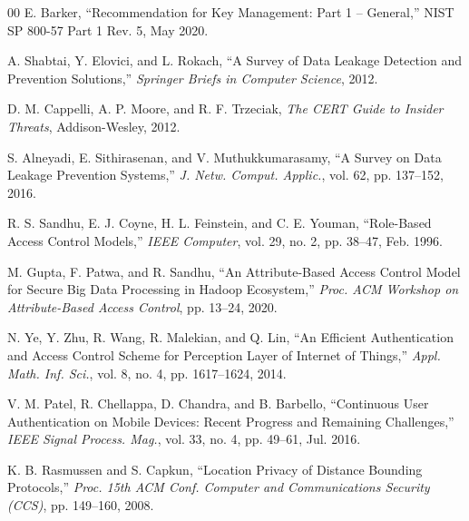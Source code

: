 \documentclass[conference]{IEEEtran}
\begin{document}
\begin{thebibliography}{00}
E. Barker, ``Recommendation for Key Management: Part 1 -- General,'' NIST SP 800-57 Part 1 Rev. 5, May 2020.

A. Shabtai, Y. Elovici, and L. Rokach, ``A Survey of Data Leakage Detection and Prevention Solutions,'' \textit{Springer Briefs in Computer Science}, 2012.

D. M. Cappelli, A. P. Moore, and R. F. Trzeciak, \textit{The CERT Guide to Insider Threats}, Addison-Wesley, 2012.

S. Alneyadi, E. Sithirasenan, and V. Muthukkumarasamy, ``A Survey on Data Leakage Prevention Systems,'' \textit{J. Netw. Comput. Applic.}, vol. 62, pp. 137--152, 2016.

R. S. Sandhu, E. J. Coyne, H. L. Feinstein, and C. E. Youman, ``Role-Based Access Control Models,'' \textit{IEEE Computer}, vol. 29, no. 2, pp. 38--47, Feb. 1996.

M. Gupta, F. Patwa, and R. Sandhu, ``An Attribute-Based Access Control Model for Secure Big Data Processing in Hadoop Ecosystem,'' \textit{Proc. ACM Workshop on Attribute-Based Access Control}, pp. 13--24, 2020.

N. Ye, Y. Zhu, R. Wang, R. Malekian, and Q. Lin, ``An Efficient Authentication and Access Control Scheme for Perception Layer of Internet of Things,'' \textit{Appl. Math. Inf. Sci.}, vol. 8, no. 4, pp. 1617--1624, 2014.

V. M. Patel, R. Chellappa, D. Chandra, and B. Barbello, ``Continuous User Authentication on Mobile Devices: Recent Progress and Remaining Challenges,'' \textit{IEEE Signal Process. Mag.}, vol. 33, no. 4, pp. 49--61, Jul. 2016.

K. B. Rasmussen and S. Capkun, ``Location Privacy of Distance Bounding Protocols,'' \textit{Proc. 15th ACM Conf. Computer and Communications Security (CCS)}, pp. 149--160, 2008.

\end{thebibliography}
\end{document}
